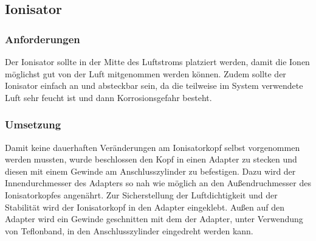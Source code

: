 \subsection{Ionisator}

\subsubsection{Anforderungen}

Der Ionisator sollte in der Mitte des Luftstroms platziert werden, damit die Ionen möglichst gut von der Luft mitgenommen werden können. Zudem sollte der Ionisator einfach an und absteckbar sein, da die teilweise im System verwendete Luft sehr feucht ist und dann Korrosionsgefahr besteht.

\subsubsection{Umsetzung}

Damit keine dauerhaften Veränderungen am Ionisatorkopf selbst vorgenommen werden mussten, wurde beschlossen den Kopf in einen Adapter zu stecken und diesen mit einem Gewinde am Anschlusszylinder zu befestigen. Dazu wird der Innendurchmesser des Adapters so nah wie möglich an den Außendruchmesser des Ionisatorkopfes angenährt. Zur Sicherstellung der Luftdichtigkeit und der Stabilität wird der Ionisatorkopf in den Adapter eingeklebt. Außen auf den Adapter wird ein Gewinde geschnitten mit dem der Adapter, unter Verwendung von Teflonband, in den Anschlusszylinder eingedreht werden kann.

